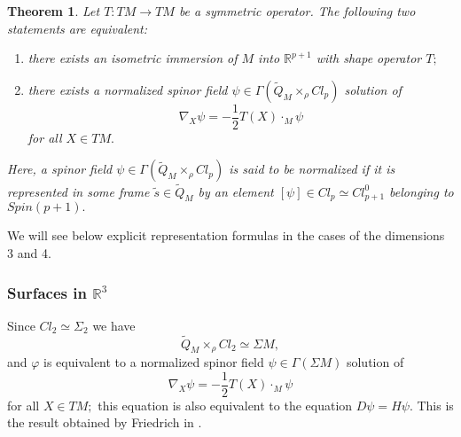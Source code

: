 \documentclass{amsart}
\newtheorem{thm}{Theorem}
\begin{document}
\begin{thm}\label{thm hypersurfaces}
Let $T:TM\rightarrow TM$ be a symmetric operator. The following two statements are equivalent:
\begin{enumerate}
\item there exists an isometric immersion of $M$ into ${\mathbb{R}}^{p+1}$ with shape operator $T;$
\item there exists a normalized spinor field $\psi\in \Gamma(\tilde Q_M\times_{\rho} Cl_p)$ solution of \begin{equation}\label{equation psi}
\nabla_X\psi=-\frac{1}{2}T(X)\cdot_M\psi
\end{equation}
for all $X\in TM.$
\end{enumerate}
Here, a spinor field $\psi\in \Gamma(\tilde Q_M\times_{\rho} Cl_p)$ is said to be normalized if it is represented in some frame $\tilde{s}\in\tilde{Q}_M$ by an element $[\psi]\in Cl_p\simeq Cl_{p+1}^0$ belonging to $Spin(p+1).$
\end{thm}
We will see below explicit representation formulas in the cases of the dimensions 3 and 4.
\subsubsection{Surfaces in ${\mathbb{R}}^3$} Since $Cl_2\simeq\Sigma_2$ we have
$$\tilde{Q}_M\times_{\rho} Cl_2\simeq\Sigma M,$$
and $\varphi$ is equivalent to a normalized spinor field $\psi\in\Gamma(\Sigma M)$ solution of 
$$\nabla_X\psi=-\frac{1}{2}T(X)\cdot_M\psi$$
for all $X\in TM;$ this equation is also equivalent to the equation $D\psi=H\psi.$ This is the result obtained by Friedrich in \cite{Fr}. 
\end{document}
